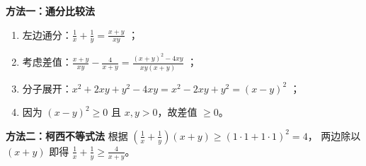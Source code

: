 \begin{proofbox}
\textbf{方法一：通分比较法}
\begin{enumerate}
    \item 左边通分：$\frac{1}{x} + \frac{1}{y} = \frac{x+y}{xy}$ ；
    \item 考虑差值：$\frac{x+y}{xy} - \frac{4}{x+y} = \frac{(x+y)^2 - 4xy}{xy(x+y)}$ ；
    \item 分子展开：$x^2 + 2xy + y^2 - 4xy = x^2 - 2xy + y^2 = (x-y)^2$ ；
    \item 因为 $(x-y)^2 \geqslant 0$ 且 $x, y > 0$，故差值 $\geqslant 0$。
\end{enumerate}

\textbf{方法二：柯西不等式法}
根据 $\left(\frac{1}{x} + \frac{1}{y}\right)(x + y) \geqslant (1 \cdot 1 + 1 \cdot 1)^2 = 4$，
两边除以 $(x+y)$ 即得 $\frac{1}{x} + \frac{1}{y} \geqslant \frac{4}{x+y}$。
\end{proofbox}